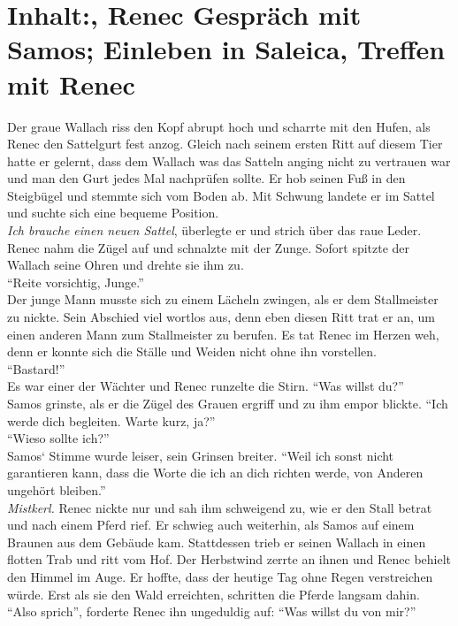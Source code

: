 \chapter{Inhalt:, Renec Gespräch mit Samos; Einleben in Saleica, Treffen mit Renec}

Der graue Wallach riss den Kopf abrupt hoch und scharrte mit den Hufen, als Renec den Sattelgurt 
fest anzog. Gleich nach seinem ersten Ritt auf diesem Tier hatte er gelernt, dass dem Wallach was 
das Satteln anging nicht zu vertrauen war und man den Gurt jedes Mal nachprüfen sollte. Er hob 
seinen Fuß in den Steigbügel und stemmte sich vom Boden ab. Mit Schwung landete er im Sattel und 
suchte sich eine bequeme Position. \\
\textit{Ich brauche einen neuen Sattel}, überlegte er und strich über das raue Leder.\\
Renec nahm die Zügel auf und schnalzte mit der Zunge. Sofort spitzte der Wallach seine Ohren und 
drehte sie ihm zu.\\
``Reite vorsichtig, Junge.''\\
Der junge Mann musste sich zu einem Lächeln zwingen, als er dem Stallmeister zu nickte. Sein 
Abschied viel wortlos aus, denn eben diesen Ritt trat er an, um einen anderen Mann zum Stallmeister 
zu berufen. Es tat Renec im Herzen weh, denn er konnte sich die Ställe und Weiden nicht ohne ihn 
vorstellen.\\
``Bastard!''\\
Es war einer der Wächter und Renec runzelte die Stirn. ``Was willst du?''\\
Samos grinste, als er die Zügel des Grauen ergriff und zu ihm empor blickte. ``Ich werde dich 
begleiten. Warte kurz, ja?''\\
``Wieso sollte ich?''\\
Samos‘ Stimme wurde leiser, sein Grinsen breiter. ``Weil ich sonst nicht garantieren kann, dass die 
Worte die ich an dich richten werde, von Anderen ungehört bleiben.''\\
\textit{Mistkerl.}
Renec nickte nur und sah ihm schweigend zu, wie er den Stall betrat und nach einem Pferd rief. Er 
schwieg auch weiterhin, als Samos auf einem Braunen aus dem Gebäude kam. Stattdessen trieb er 
seinen 
Wallach in einen flotten Trab und ritt vom Hof. Der Herbstwind zerrte an ihnen und Renec behielt 
den 
Himmel im Auge. Er hoffte, dass der heutige Tag ohne Regen verstreichen würde. Erst als sie den 
Wald 
erreichten, schritten die Pferde langsam dahin.\\
``Also sprich'', forderte Renec ihn ungeduldig auf: ``Was willst du von mir?''\\
